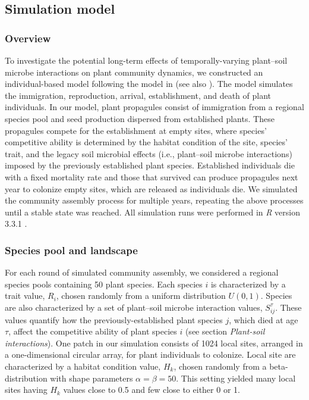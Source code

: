 \subsection{Simulation model}
\subsubsection*{Overview}
To investigate the potential long-term effects of temporally-varying plant--soil microbe interactions on plant community dynamics, we constructed an individual-based model following the model in  \citet{FukamiNakajima2011} (see also \citealp{Fukami2013, ZeeFukami2015, Fukami2017}). The model simulates the immigration, reproduction, arrival, establishment, and death of plant individuals. 
In our model, plant propagules consist of immigration from a regional species pool and seed production dispersed from established plants. These propagules compete for the establishment at empty sites, where species' competitive ability is determined by the habitat condition of the site, species' trait, and the legacy soil microbial effects (i.e., plant--soil microbe interactions) imposed by the previously established plant species. 
Established individuals die with a fixed mortality rate and those that survived can produce propagules next year to colonize empty sites, which are released as individuals die.
We simulated the community assembly process for multiple years, repeating the above processes until a stable state was reached. All simulation runs were performed in \textit{R} version 3.3.1 \citep{R}. 
\par


\subsubsection*{Species pool and landscape}
For each round of simulated community assembly, we considered a regional species pools containing 50 plant species. Each species $i$ is characterized by a trait value, $R_{i}$, chosen randomly from a uniform distribution $U\left ( 0, 1 \right )$. Species are also characterized by a set of plant--soil microbe interaction values, $S_{ij}^{\tau}$. These values quantify how the previously-established plant species $j$, which died at age $\tau$, affect the competitive ability of plant species $i$ (see section \textit{Plant-soil interactions}). 
One patch in our simulation consists of 1024 local sites, arranged in a one-dimensional circular array, for plant individuals to colonize. Local site are characterized by a habitat condition value, $H_{k}$, chosen randomly from a beta-distribution with shape parameters $\alpha = \beta = 50$. This setting yielded many local sites having $H_{k}$ values close to 0.5 and few close to either 0 or 1. 
\par


